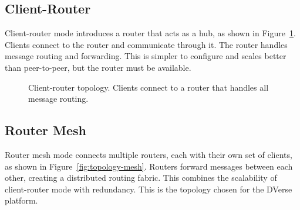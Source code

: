 \documentclass[11pt,a4paper]{article}
\begin{document}
\subsection{Client-Router}

Client-router mode introduces a router that acts as a hub, as shown
in Figure~\ref{fig:topology-cr}. Clients connect to the router and
communicate through it. The router handles message routing and
forwarding. This is simpler to configure and scales better than
peer-to-peer, but the router must be available.

\begin{figure}[H]
  \centering
  \caption{Client-router topology. Clients connect to a router that
  handles all message routing.}
  \label{fig:topology-cr}
\end{figure}

\subsection{Router Mesh}

Router mesh mode connects multiple routers, each with their own set
of clients, as shown in Figure~\ref{fig:topology-mesh}. Routers
forward messages between each other, creating a distributed routing
fabric. This combines the scalability of client-router mode with
redundancy. This is the topology chosen for the DVerse platform.
\end{document}
